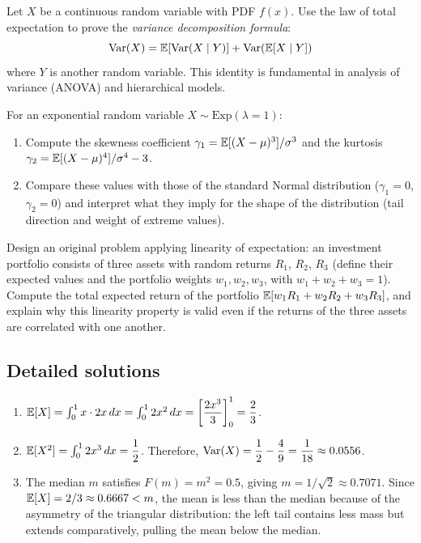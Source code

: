 \begin{problema}
	\label{prob:de8d740}
	Let $X$ be a continuous random variable with PDF $f(x)$. Use the law of total expectation to prove the \emph{variance decomposition formula}:
	$$\operatorname{Var}(X) = \mathbb{E}[\operatorname{Var}(X \mid Y)] + \operatorname{Var}(\mathbb{E}[X \mid Y])$$
	where $Y$ is another random variable. This identity is fundamental in analysis of variance (ANOVA) and hierarchical models.
\end{problema}

\begin{problema}
	\label{prob:9d4a41b}
	For an exponential random variable $X \sim \text{Exp}(\lambda = 1)$:
	\begin{enumerate}
		\item Compute the skewness coefficient $\gamma_{1} = \mathbb{E}[(X - \mu)^{3}]/\sigma^{3}$ and the kurtosis $\gamma_{2} = \mathbb{E}[(X - \mu)^{4}]/\sigma^{4} - 3$.
		\item Compare these values with those of the standard Normal distribution ($\gamma_{1} = 0$, $\gamma_{2} = 0$) and interpret what they imply for the shape of the distribution (tail direction and weight of extreme values).
	\end{enumerate}
\end{problema}

\begin{problema}
	\label{prob:5c186f2}
	Design an original problem applying linearity of expectation: an investment portfolio consists of three assets with random returns $R_1$, $R_2$, $R_3$ (define their expected values and the portfolio weights $w_1, w_2, w_3$, with $w_1+w_2+w_3=1$). Compute the total expected return of the portfolio $\mathbb{E}[w_1R_1+w_2R_2+w_3R_3]$, and explain why this linearity property is valid even if the returns of the three assets are correlated with one another.
\end{problema}

\subsection*{Detailed solutions}

\begin{solproblema}
	\begin{enumerate}
		\item $\mathbb{E}[X] = \int_{0}^{1} x \cdot 2x\,dx = \int_{0}^{1} 2x^{2}\,dx = \left[ \dfrac{2x^{3}}{3} \right]_{0}^{1} = \dfrac{2}{3}$.
		\item $\mathbb{E}[X^{2}] = \int_{0}^{1} 2x^{3}\,dx = \dfrac{1}{2}$. Therefore, $\operatorname{Var}(X) = \dfrac{1}{2} - \dfrac{4}{9} = \dfrac{1}{18} \approx 0.0556$.
		\item The median $m$ satisfies $F(m) = m^{2} = 0.5$, giving $m = 1/\sqrt{2} \approx 0.7071$. Since $\mathbb{E}[X] = 2/3 \approx 0.6667 < m$, the mean is less than the median because of the asymmetry of the triangular distribution: the left tail contains less mass but extends comparatively, pulling the mean below the median.
	\end{enumerate}
\end{solproblema}

